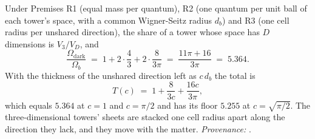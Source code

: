 Under Premises R1 (equal mass per quantum), R2 (one quantum per unit ball of each tower's space, with a common Wigner-Seitz radius $d_{b}$) and R3 (one cell radius per unshared direction), the share of a tower whose space has $D$ dimensions is $V_{3}/V_{D}$, and
\[
\frac{\Omega_{\mathrm{dark}}}{\Omega_{b}} \;=\; 1 + 2\cdot\frac{4}{3} + 2\cdot\frac{8}{3\pi} \;=\; \frac{11\pi + 16}{3\pi} \;=\; 5.364 .
\]
With the thickness of the unshared direction left as $c\,d_{b}$ the total is
\[
T(c) \;=\; 1 + \frac{8}{3c} + \frac{16c}{3\pi},
\]
which equals $5.364$ at $c = 1$ and $c = \pi/2$ and has its floor $5.255$ at $c = \sqrt{\pi/2}$. The three-dimensional towers' sheets are stacked one cell radius apart along the direction they lack, and they move with the matter. \emph{Provenance:} \cite[Prems.~7.2 to 7.4, Props.~7.6, 7.15 and 7.28]{ButlerT14}.
